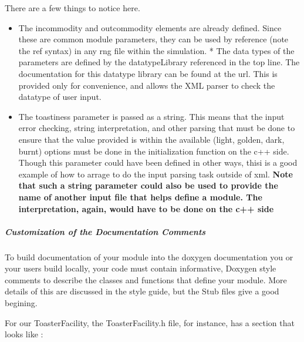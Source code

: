 \documentclass[letterpaper,10pt,english]{sphinxmanual}
\begin{document}
There are a few things to notice here.
\begin{itemize}
\item {} 
The incommodity and outcommodity elements are already defined. Since these are
common module parameters, they can be used by reference (note the ref syntax)
in any rng file within the simulation.  * The data types of the parameters are
defined by the datatypeLibrary referenced in the top line. The documentation
for this datatype library can be found at the url. This is provided only for
convenience, and allows the XML parser to check the datatype of user input.

\item {} 
The toastiness parameter is passed as a string. This means that the input
error checking, string interpretation, and other parsing that must be done to
ensure that the value provided is within the available (light, golden, dark,
burnt) options must be done in the initialization function on the c++ side.
Though this parameter could have been defined in other ways, thisi is a good
example of how to arrage to do the input parsing task outside of xml. \textbf{Note
that such a string parameter could also be used to provide the name of another
input file that helps define a module. The interpretation, again, would have
to be done on the c++ side}

\end{itemize}


\subparagraph{Customization of the Documentation Comments}
\label{devdoc/make-models/toaster:customization-of-the-documentation-comments}
To build documentation of your module into the doxygen documentation you or your
users build locally, your code must contain informative, Doxygen style comments
to describe the classes and functions that define your module. More details of
this are discussed in the style guide, but the Stub files give a good begining.

For our ToasterFacility, the ToasterFacility.h file, for instance, has a section
that looks like :
\end{document}
